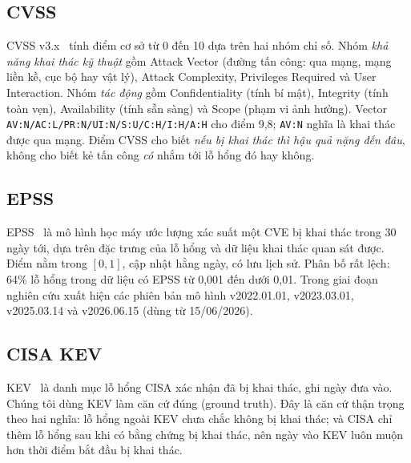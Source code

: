 \documentclass[conference]{IEEEtran}
\begin{document}
\subsection{CVSS}
CVSS v3.x~\cite{cvss31} tính điểm cơ sở từ 0 đến 10 dựa trên hai nhóm chỉ số. Nhóm \emph{khả năng khai thác
kỹ thuật} gồm Attack Vector (đường tấn công: qua mạng, mạng liền kề, cục bộ hay vật lý), Attack
Complexity, Privileges Required và User Interaction. Nhóm \emph{tác động} gồm Confidentiality (tính bí mật), Integrity (tính toàn vẹn), Availability (tính sẵn sàng) và Scope (phạm vi ảnh hưởng). Vector \texttt{AV:N/AC:L/PR:N/UI:N/S:U/C:H/I:H/A:H} cho điểm
9,8; \texttt{AV:N} nghĩa là khai thác được qua mạng. Điểm CVSS cho biết \emph{nếu bị khai thác thì
hậu quả nặng đến đâu}, không cho biết kẻ tấn công \emph{có} nhắm tới lỗ hổng đó hay không.

\subsection{EPSS}
EPSS~\cite{epss} là mô hình học máy ước lượng xác suất một CVE bị khai thác trong 30 ngày tới,
dựa trên đặc trưng của lỗ hổng và dữ liệu khai thác quan sát được. Điểm nằm trong $[0, 1]$, cập
nhật hằng ngày, có lưu lịch sử. Phân bố rất lệch: 64\% lỗ hổng trong dữ liệu có EPSS từ 0,001 đến
dưới 0,01. Trong giai đoạn nghiên cứu xuất hiện các phiên bản mô hình v2022.01.01, v2023.03.01, v2025.03.14 và v2026.06.15 (dùng từ 15/06/2026).

\subsection{CISA KEV}
KEV~\cite{kev} là danh mục lỗ hổng CISA xác nhận đã bị khai thác, ghi ngày đưa vào. Chúng tôi dùng
KEV làm căn cứ đúng (ground truth). Đây là căn cứ thận trọng theo hai nghĩa: lỗ hổng ngoài KEV chưa
chắc không bị khai thác; và CISA chỉ thêm lỗ hổng sau khi có bằng chứng bị khai thác, nên ngày vào
KEV luôn muộn hơn thời điểm bắt đầu bị khai thác.
\end{document}
